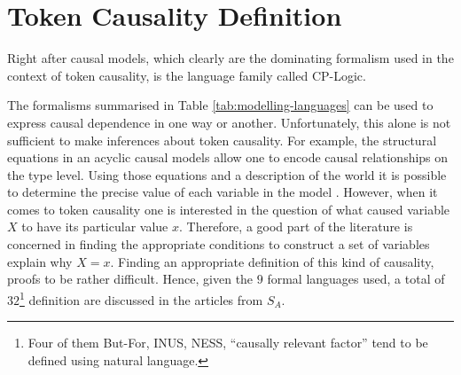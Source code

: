 \documentclass[11pt,a4paper]{book}
\theoremstyle{definition}
\theoremstyle{definition}
\theoremstyle{definition}
\theoremstyle{remark}
\newcommand{\prset}{S_{A}}
\begin{document}
\clearpage
\section{Token Causality Definition}

Right after causal models, which clearly are the dominating formalism used in the context of token causality, is the language family called CP-Logic.

The formalisms summarised in Table \ref{tab:modelling-languages} can be used to express causal dependence in one way or another. Unfortunately, this alone is not sufficient to make inferences about token causality.
For example, the structural equations in an acyclic causal models allow one to encode causal relationships on the type level. Using those equations and a description of the world it is possible to determine the precise value 
of each variable in the model \parencite{halpern2015cause}. However, when it comes to token causality one is interested in the question of what caused variable $X$ to have its particular value $x$. Therefore, a good part of the literature is concerned in finding the appropriate conditions to construct a set of variables explain why $X=x$. Finding an appropriate definition of this kind of causality, proofs to be rather difficult. Hence, given the $9$ formal languages used, a total of $32$\footnote{Four of them But-For, INUS, NESS, ``causally relevant factor'' tend to be defined using natural language.} definition are discussed in the articles from $\prset$.
\end{document}
